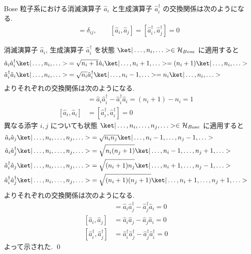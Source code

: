 \documentclass[uplatex,dvipdfmx,a4paper,11pt]{jlreq}
\makeatletter
\newcommand{\HH}{\mathcal{H}}
\numberwithin{equation}{section}
\theoremstyle{definition}
\renewenvironment{proof}[1][\proofname]{\par
  \normalfont
  \topsep6\p@\@plus6\p@ \trivlist
  \item[\hskip\labelsep{\bfseries #1}\@addpunct{\bfseries}]\ignorespaces\quad\par
}{%
  \qed\endtrivlist\@endpefalse
}
\renewcommand\proofname{証明}
\makeatother
\begin{document}
\begin{proposition}[Q21-37]
  Bose 粒子系における消滅演算子 $\hat{a}_i$ と生成演算子 $\hat{a}_i^\dagger$ の交換関係は次のようになる.
  \begin{align}
    [\hat{a}_i, \hat{a}_j^\dagger] & = \delta_{ij}, \qquad [\hat{a}_i, \hat{a}_j] = [\hat{a}_i^\dagger, \hat{a}_j^\dagger] = 0
  \end{align}
\end{proposition}
\begin{proof}
  消滅演算子 $\hat{a}_i$, 生成演算子 $\hat{a}_i^\dagger$ を状態 $\ket|\ldots,n_i,\ldots>\in\HH_{Bose}$ に適用すると
  \begin{align}
    \hat{a}_i\hat{a}_i^\dagger\ket|\ldots,n_i,\ldots> & = \sqrt{n_i + 1}\hat{a}_i\ket|\ldots,n_i+1,\ldots> = (n_i + 1)\ket|\ldots,n_i,\ldots> \\
    \hat{a}_i^\dagger\hat{a}_i\ket|\ldots,n_i,\ldots> & = \sqrt{n_i}\hat{a}_i^\dagger\ket|\ldots,n_i-1,\ldots> = n_i\ket|\ldots,n_i,\ldots>
  \end{align}
  よりそれぞれの交換関係は次のようになる.
  \begin{align}
    [\hat{a}_i, \hat{a}_i^\dagger] & = \hat{a}_i\hat{a}_i^\dagger - \hat{a}_i^\dagger\hat{a}_i = (n_i + 1) - n_i = 1 \\
    [\hat{a}_i, \hat{a}_i]         & = [\hat{a}_i^\dagger, \hat{a}_i^\dagger] = 0
  \end{align}
  異なる添字 $i, j$ についても状態 $\ket|\ldots,n_i,\ldots,n_j,\ldots>\in\HH_{Bose}$ に適用すると
  \begin{align}
    \hat{a}_i\hat{a}_j\ket|\ldots,n_i,\ldots,n_j,\ldots>                 & = \sqrt{n_in_j}\ket|\ldots,n_i-1,\ldots,n_j-1,\ldots>             \\
    \hat{a}_i\hat{a}_j^\dagger\ket|\ldots,n_i,\ldots,n_j,\ldots>         & = \sqrt{n_i(n_j + 1)}\ket|\ldots,n_i-1,\ldots,n_j+1,\ldots>       \\
    \hat{a}_i^\dagger\hat{a}_j\ket|\ldots,n_i,\ldots,n_j,\ldots>         & = \sqrt{(n_i + 1)n_j}\ket|\ldots,n_i+1,\ldots,n_j-1,\ldots>       \\
    \hat{a}_i^\dagger\hat{a}_j^\dagger\ket|\ldots,n_i,\ldots,n_j,\ldots> & = \sqrt{(n_i + 1)(n_j + 1)}\ket|\ldots,n_i+1,\ldots,n_j+1,\ldots>
  \end{align}
  よりそれぞれの交換関係は次のようになる.
  \begin{align}
    [\hat{a}_i, \hat{a}_j^\dagger]         & = \hat{a}_i\hat{a}_j^\dagger - \hat{a}_j^\dagger\hat{a}_i = 0                 \\
    [\hat{a}_i, \hat{a}_j]                 & = \hat{a}_i\hat{a}_j - \hat{a}_j\hat{a}_i = 0                                 \\
    [\hat{a}_i^\dagger, \hat{a}_j^\dagger] & = \hat{a}_i^\dagger\hat{a}_j^\dagger - \hat{a}_j^\dagger\hat{a}_i^\dagger = 0
  \end{align}
  よって示された.
\end{proof}
\end{document}
